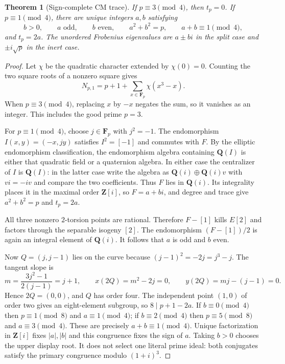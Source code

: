 \documentclass[10pt]{article}
\newtheorem{theorem}{Theorem}
\newcommand{\F}{\mathbf F}
\newcommand{\Z}{\mathbf Z}
\newcommand{\Q}{\mathbf Q}
\begin{document}
\begin{theorem}[Sign-complete CM trace]
If $p\equiv3\pmod4$, then $t_p=0$. If $p\equiv1\pmod4$, there are
unique integers $a,b$ satisfying
\[
 b>0,\qquad a\text{ odd},\qquad b\text{ even},\qquad
 a^2+b^2=p,\qquad a+b\equiv1\pmod4,
\]
and $t_p=2a$. The unordered Frobenius eigenvalues are $a\pm bi$ in the
split case and $\pm i\sqrt p$ in the inert case.
\end{theorem}
\begin{proof}
Let $\chi$ be the quadratic character extended by $\chi(0)=0$. Counting
the two square roots of a nonzero square gives
\[
 N_{p,1}=p+1+\sum_{x\in\F_p}\chi(x^3-x).
\]
When $p\equiv3\pmod4$, replacing $x$ by $-x$ negates the sum, so it
vanishes as an integer. This includes the good prime $p=3$.

For $p\equiv1\pmod4$, choose $j\in\F_p$ with $j^2=-1$. The
endomorphism $I(x,y)=(-x,jy)$ satisfies $I^2=[-1]$ and commutes with
$F$. By the elliptic endomorphism classification, the endomorphism
algebra containing $\Q(I)$ is either that quadratic field or a quaternion
algebra. In either case the centralizer of $I$ is $\Q(I)$: in the latter
case write the algebra as $\Q(i)\oplus\Q(i)v$ with $vi=-iv$ and compare
the two coefficients. Thus $F$ lies in $\Q(i)$. Its integrality places
it in the maximal order $\Z[i]$, so $F=a+bi$, and degree and trace give
$a^2+b^2=p$ and $t_p=2a$.

All three nonzero $2$-torsion points are rational. Therefore $F-[1]$
kills $E[2]$ and factors through the separable isogeny $[2]$. The
endomorphism $(F-[1])/2$ is again an integral element of $\Q(i)$.
It follows that $a$ is odd and $b$ even.

Now $Q=(j,j-1)$ lies on the curve because $(j-1)^2=-2j=j^3-j$.
The tangent slope is
\[
 m=\frac{3j^2-1}{2(j-1)}=j+1,
 \qquad x(2Q)=m^2-2j=0,
 \qquad y(2Q)=mj-(j-1)=0.
\]
Hence $2Q=(0,0)$, and $Q$ has order four. The independent point
$(1,0)$ of order two gives an eight-element subgroup, so
$8\mid p+1-2a$. If $b\equiv0\pmod4$ then $p\equiv1\pmod8$ and
$a\equiv1\pmod4$; if $b\equiv2\pmod4$ then $p\equiv5\pmod8$ and
$a\equiv3\pmod4$. These are precisely $a+b\equiv1\pmod4$.
Unique factorization in $\Z[i]$ fixes $|a|,|b|$ and this congruence
fixes the sign of $a$. Taking $b>0$ chooses the upper display root.
It does not select one literal prime ideal: both conjugates satisfy
the primary congruence modulo $(1+i)^3$.
\end{proof}
\end{document}
